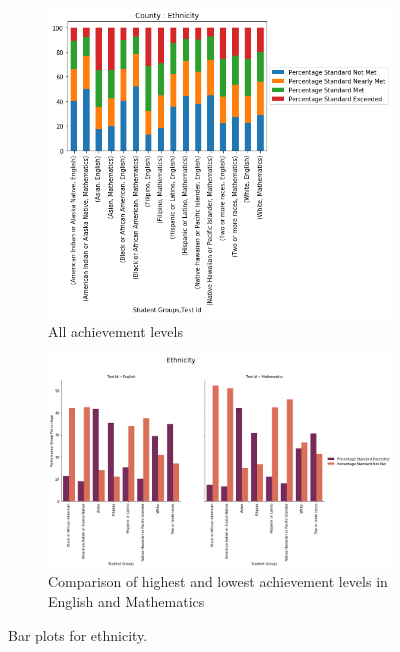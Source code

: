 \documentclass[11pt]{article}
\begin{document}
\begin{figure}[h!]
\centering
\begin{subfigure}[h]{0.35\textwidth}
         \centering
         \includegraphics[width=\textwidth]{output_28_0.png}
         \caption{All achievement levels}
         \label{fig:Ethnicity_all}
\end{subfigure}
\hfill
\begin{subfigure}{0.6\textwidth}
         \centering
         \includegraphics[width=\textwidth]{output_29_1.png}
         \caption{Comparison of highest and lowest achievement levels 
in English and Mathematics}
         \label{fig:Ethnicity_two}
\end{subfigure}
\caption{Bar plots for ethnicity.}
\label{fig:all_Ethnicity}
\end{figure}
\end{document}

